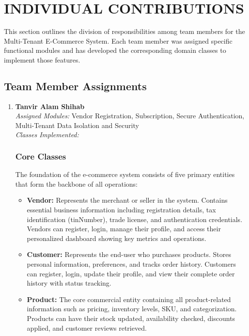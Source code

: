 \chapter{INDIVIDUAL CONTRIBUTIONS} \label{ch:data}


This section outlines the division of responsibilities among team members for the Multi-Tenant E-Commerce System. Each team member was assigned specific functional modules and has developed the corresponding domain classes to implement those features.

\section*{Team Member Assignments}

\begin{enumerate}

\item \textbf{Tanvir Alam Shihab} \\
\textit{Assigned Modules:} Vendor Registration, Subscription, Secure Authentication, Multi-Tenant Data Isolation and Security \\
\textit{Classes Implemented:} 
\subsection*{Core Classes}
The foundation of the e-commerce system consists of five primary entities that form the backbone of all operations:

\begin{itemize}
    \item \textbf{Vendor:} Represents the merchant or seller in the system. Contains essential business information including registration details, tax identification (tinNumber), trade license, and authentication credentials. Vendors can register, login, manage their profile, and access their personalized dashboard showing key metrics and operations.
    
    \item \textbf{Customer:} Represents the end-user who purchases products. Stores personal information, preferences, and tracks order history. Customers can register, login, update their profile, and view their complete order history with status tracking.
    
    \item \textbf{Product:} The core commercial entity containing all product-related information such as pricing, inventory levels, SKU, and categorization. Products can have their stock updated, availability checked, discounts applied, and customer reviews retrieved.
    

\end{itemize}
\end{enumerate}

